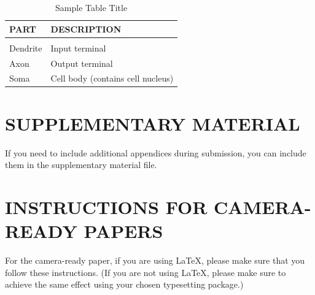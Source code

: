 \documentclass[twoside]{article}
\begin{document}
\begin{table}[h]
\caption{Sample Table Title} \label{sample-table}
\begin{center}
\begin{tabular}{ll}
\textbf{PART}  &\textbf{DESCRIPTION} \\
\hline \\
Dendrite         &Input terminal \\
Axon             &Output terminal \\
Soma             &Cell body (contains cell nucleus) \\
\end{tabular}
\end{center}
\end{table}

\section{SUPPLEMENTARY MATERIAL}

If you need to include additional appendices during submission, you
can include them in the supplementary material file.



\section{INSTRUCTIONS FOR CAMERA-READY PAPERS}

For the camera-ready paper, if you are using \LaTeX, please make sure
that you follow these instructions.  (If you are not using \LaTeX,
please make sure to achieve the same effect using your chosen
typesetting package.)
\end{document}
